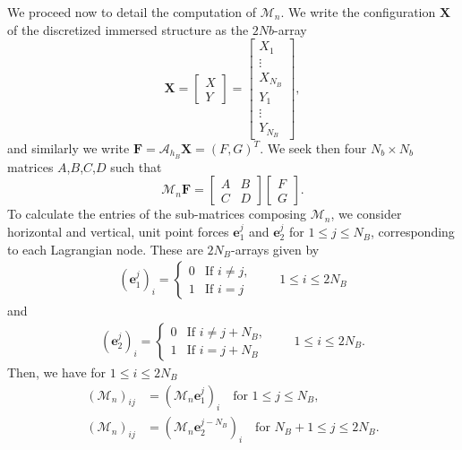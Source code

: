 \documentclass[preprint,12pt]{elsarticle}
\begin{document}
We proceed now to detail the computation of $\mathcal{M}_n$.  We write the configuration $\mathbf{X}$ of the discretized immersed structure as the $2Nb$-array 
\begin{equation}
\mathbf{X}=\begin{bmatrix} X \\ Y \end{bmatrix} =
 \begin{bmatrix} X_1 \\ \vdots \\ X_{N_B} \\Y_1 \\ \vdots \\Y_{N_B}
\end{bmatrix} ,
\end{equation}
and similarly we write  $\mathbf{F}=\mathcal{A}_{h_B}\mathbf{X}=(F,G)^T$. We seek then four $N_b\times N_b$ matrices $A$,$B$,$C$,$D$ such that
\begin{equation}
\mathcal{M}_n\mathbf{F} =
\begin{bmatrix}
A & B \\
C & D \end{bmatrix}
\begin{bmatrix}
F  \\
G \end{bmatrix} .
\end{equation}
 To calculate the entries of the sub-matrices composing $\mathcal{M}_n$, we consider horizontal and vertical, unit point forces $\mathbf{e}_1^j$ and $\mathbf{e}_2^j$ for $1 \leq j \leq N_B$, corresponding to each Lagrangian node. These are $2N_B$-arrays  given by
\begin{align}
(\mathbf{e}_1^j)_i =
\begin{cases}
0
 & \text{If $i \neq j$}, \\
1 & \text{If $i=j$}
\end{cases} \qquad 1 \leq i \leq 2N_B \label{eq:e1}
\end{align}
and 
\begin{align}
(\mathbf{e}_2^j)_i =
\begin{cases}
0
 & \text{If $i \neq j+N_B$}, \\
1 & \text{If $i=j+N_B$}
\end{cases} \qquad 1 \leq i \leq 2N_B.\label{eq:e2}
\end{align}
Then,  we have for  $1\leq i \leq 2N_B$ 
\begin{align}
(\mathcal{M}_{n})_{ij} &=(\mathcal{M}_n\mathbf{e}_1^j)_i \quad \text{for $1\leq j \leq N_B$} ,\\
(\mathcal{M}_{n})_{ij} &=(\mathcal{M}_n\mathbf{e}_2^{j-N_B})_i \quad \text{for  $N_B + 1\leq j \leq 2N_B$} .
\end{align}
\end{document}
